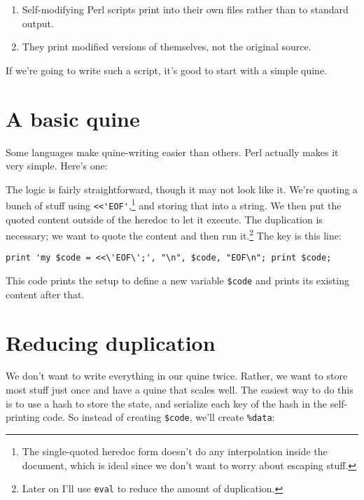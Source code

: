 \documentclass{report}
\begin{document}
\begin{enumerate}
\item{Self-modifying Perl scripts print into their own files rather than to standard output.}
\item{They print modified versions of themselves, not the original source.}
\end{enumerate}

  \noindent If we're going to write such a script, it's good to start with a simple quine.

\section{A basic quine}\label{sec:a-basic-quine}
    Some languages make quine-writing easier than others. Perl actually makes it very simple. Here's one:


    \noindent The logic is fairly straightforward, though it may not look like it. We're quoting a bunch of stuff using \verb|<<'EOF'|,\footnote{The single-quoted heredoc form doesn't do any
    interpolation inside the document, which is ideal since we don't want to worry about escaping stuff.} and storing that into a string. We then put the quoted content outside of the heredoc
    to let it execute. The duplication is necessary; we want to quote the content and then run it.\footnote{Later on I'll use {\tt eval} to reduce the amount of duplication.} The key is this
    line:

\begin{verbatim}
print 'my $code = <<\'EOF\';', "\n", $code, "EOF\n"; print $code;
\end{verbatim}

    \noindent This code prints the setup to define a new variable \verb|$code| and prints its existing content after that.

\section{Reducing duplication}\label{sec:reducing-duplication}
    We don't want to write everything in our quine twice. Rather, we want to store most stuff just once and have a quine that scales well. The easiest way to do this is to use a hash to store
    the state, and serialize each key of the hash in the self-printing code. So instead of creating \verb|$code|, we'll create \verb|%data|:
\end{document}
